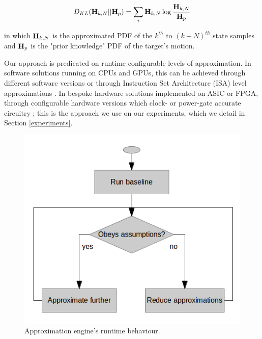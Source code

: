\begin{equation}
D_{KL}({\bf H}_{k, N} || {\bf H}_{p}) = \sum_{i}{{\bf H}_{k, N}} \log{\frac{{\bf H}_{k, N}}{{\bf H}_{p}}}
\label{eq:KLDIV1}
\end{equation}

\noindent in which ${\bf H}_{k, N}$ is the approximated PDF of the $k^{th}$ to $(k+N)^{th}$ state samples and ${\bf H}_{p}$ is the "prior knowledge" PDF of the target's motion.

\par Our approach is predicated on runtime-configurable levels of approximation. In software solutions running on CPUs and GPUs, this can be achieved through different software versions \cite{vassiliadis2015programming} or through Instruction Set Architecture (ISA) level approximations \cite{venkataramani2013quality}. In bespoke hardware solutions implemented on ASIC or FPGA, through configurable hardware versions which clock- or power-gate accurate circuitry \cite{chan2013statistical}; this is the approach we use on our experiments, which we detail in Section \ref{experiments}.

\begin{figure}[tb]
  \centering
  \includegraphics[width=0.7\columnwidth]{img/flowchart.png}
  \caption{Approximation engine's runtime behaviour.}
  \label{fig:flowchart}
\end{figure}
